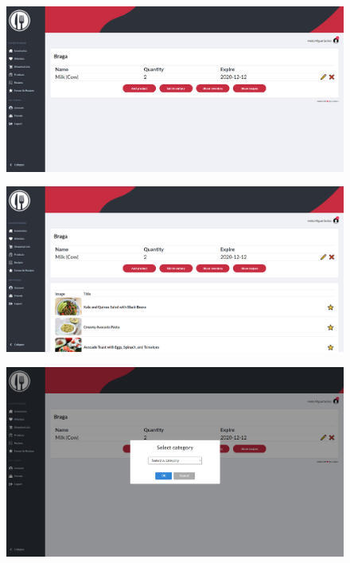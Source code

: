 \documentclass[a4paper]{report}
\begin{document}
    \begin{figure}[H]
        \centering
            \includegraphics[width=\textwidth]{images/produto_final/iventario.png}
    \end{figure}

    \begin{figure}[H]
        \centering
            \includegraphics[width=\textwidth]{images/produto_final/iventario_receitas.png}
    \end{figure}

    \begin{figure}[H]
        \centering
            \includegraphics[width=\textwidth]{images/produto_final/inserir_produto_categoria.png}
    \end{figure}
\end{document}

